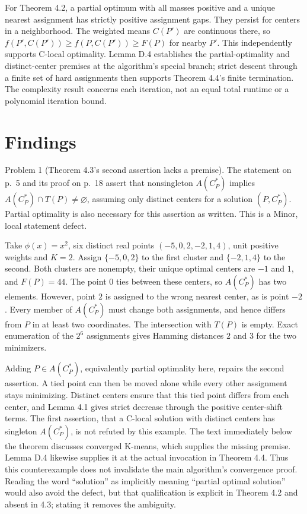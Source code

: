 \documentclass[10pt]{article}
\begin{document}
For Theorem 4.2, a partial optimum with all masses positive and a unique nearest assignment has strictly positive assignment gaps. They persist for centers in a neighborhood. The weighted means \(C(P')\) are continuous there, so \(f(P',C(P'))\geq f(P,C(P'))\geq F(P)\) for nearby \(P'\). This independently supports C-local optimality. Lemma D.4 establishes the partial-optimality and distinct-center premises at the algorithm’s special branch; strict descent through a finite set of hard assignments then supports Theorem 4.4’s finite termination. The complexity result concerns each iteration, not an equal total runtime or a polynomial iteration bound.\par
\section*{Findings}
Problem 1 (Theorem 4.3’s second assertion lacks a premise).  The statement on p. 5 and its proof on p. 18 assert that nonsingleton \(A(C_P^*)\) implies \(A(C_P^*)\cap T(P)\ne\varnothing\), assuming only distinct centers for a solution \((P,C_P^*)\). Partial optimality is also necessary for this assertion as written. This is a Minor, local statement defect.\par
Take \(\phi(x)=x^2\), six distinct real points \((-5,0,2,-2,1,4)\), unit positive weights and \(K=2\). Assign \(\{-5,0,2\}\) to the first cluster and \(\{-2,1,4\}\) to the second. Both clusters are nonempty, their unique optimal centers are \(-1\) and \(1\), and \(F(P)=44\). The point \(0\) ties between these centers, so \(A(C_P^*)\) has two elements. However, point \(2\) is assigned to the wrong nearest center, as is point \(-2\). Every member of \(A(C_P^*)\) must change both assignments, and hence differs from \(P\) in at least two coordinates. The intersection with \(T(P)\) is empty. Exact enumeration of the \(2^6\) assignments gives Hamming distances \(2\) and \(3\) for the two minimizers.\par
Adding \(P\in A(C_P^*)\), equivalently partial optimality here, repairs the second assertion. A tied point can then be moved alone while every other assignment stays minimizing. Distinct centers ensure that this tied point differs from each center, and Lemma 4.1 gives strict decrease through the positive center-shift terms. The first assertion, that a C-local solution with distinct centers has singleton \(A(C_P^*)\), is not refuted by this example. The text immediately below the theorem discusses converged K-means, which supplies the missing premise. Lemma D.4 likewise supplies it at the actual invocation in Theorem 4.4. Thus this counterexample does not invalidate the main algorithm’s convergence proof. Reading the word “solution” as implicitly meaning “partial optimal solution” would also avoid the defect, but that qualification is explicit in Theorem 4.2 and absent in 4.3; stating it removes the ambiguity.\par
\end{document}
